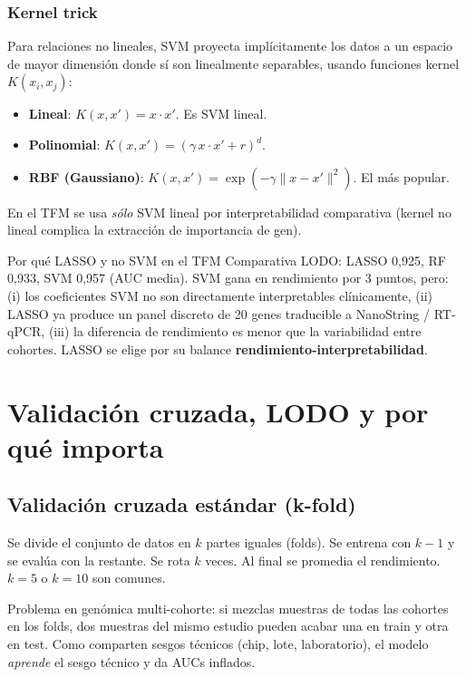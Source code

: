 \documentclass[11pt, a4paper]{article}
\begin{document}
\subsubsection*{Kernel trick}

Para relaciones no lineales, SVM proyecta impl\'icitamente los datos a
un espacio de mayor dimensi\'on donde s\'i son linealmente separables,
usando funciones kernel $K(x_i, x_j)$:

\begin{itemize}[leftmargin=1.2em]
  \item \textbf{Lineal}: $K(x,x') = x \cdot x'$. Es SVM lineal.
  \item \textbf{Polinomial}: $K(x,x') = (\gamma \, x \cdot x' + r)^d$.
  \item \textbf{RBF (Gaussiano)}: $K(x,x') = \exp(-\gamma \|x-x'\|^2)$.
  El m\'as popular.
\end{itemize}

En el TFM se usa \emph{s\'olo} SVM lineal por interpretabilidad
comparativa (kernel no lineal complica la extracci\'on de importancia
de gen).

\begin{concepto}{Por qu\'e LASSO y no SVM en el TFM}
Comparativa LODO: LASSO 0,925, RF 0,933, SVM 0,957 (AUC media). SVM
gana en rendimiento por 3 puntos, pero: (i) los coeficientes SVM no son
directamente interpretables cl\'inicamente, (ii) LASSO ya produce un
panel discreto de 20 genes traducible a NanoString / RT-qPCR, (iii) la
diferencia de rendimiento es menor que la variabilidad entre cohortes.
LASSO se elige por su balance \textbf{rendimiento-interpretabilidad}.
\end{concepto}

\section{Validaci\'on cruzada, LODO y por qu\'e importa}

\subsection{Validaci\'on cruzada est\'andar (k-fold)}

Se divide el conjunto de datos en $k$ partes iguales (folds). Se entrena
con $k-1$ y se eval\'ua con la restante. Se rota $k$ veces. Al final se
promedia el rendimiento. $k = 5$ o $k = 10$ son comunes.

Problema en gen\'omica multi-cohorte: si mezclas muestras de todas las
cohortes en los folds, dos muestras del mismo estudio pueden acabar una
en train y otra en test. Como comparten sesgos t\'ecnicos (chip, lote,
laboratorio), el modelo \emph{aprende} el sesgo t\'ecnico y da AUCs
inflados.
\end{document}
